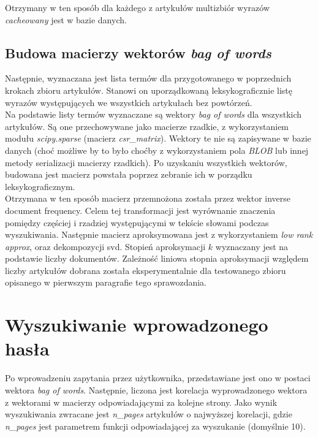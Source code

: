 \documentclass{article}
\begin{document}
        Otrzymany w ten sposób dla każdego z artykułów multizbiór wyrazów \textit{cacheowany} jest w bazie danych.
    
        \subsection{Budowa macierzy wektorów \textit{bag of words}}
        Następnie, wyznaczana jest lista termów dla przygotowanego w poprzednich krokach zbioru artykułów. Stanowi on uporządkowaną leksykograficznie listę wyrazów występujących we wszystkich artykułach bez powtórzeń.\\
        
        Na podstawie listy termów wyznaczane są wektory \textit{bag of words} dla wszystkich artykułów. Są one przechowywane jako macierze rzadkie, z wykorzystaniem modułu \textit{scipy.sparse} (macierz \textit{csr\_matrix}). Wektory te nie są zapisywane w bazie danych (choć możliwe by to było choćby z wykorzystaniem pola \textit{BLOB} lub innej metody serializacji macierzy rzadkich). Po uzyskaniu wszystkich wektorów, budowana jest macierz powstała poprzez zebranie ich w porządku leksykograficznym. \\
        
        Otrzymana w ten sposób macierz przemnożona została przez wektor inverse document frequency. Celem tej transformacji jest wyrównanie znaczenia pomiędzy częściej i rzadziej występującymi w tekście słowami podczas wyszukiwania. Następnie macierz aproksymowana jest z wykorzystaniem \textit{low rank approx}, oraz dekompozycji svd. Stopień aproksymacji $k$ wyznaczany jest na podstawie liczby dokumentów. Zależność liniowa stopnia aproksymacji względem liczby artykułów dobrana została eksperymentalnie dla testowanego zbioru opisanego w pierwszym paragrafie tego sprawozdania. 
        
    \section{Wyszukiwanie wprowadzonego hasła}
        Po wprowadzeniu zapytania przez użytkownika, przedstawiane jest ono w postaci wektora \textit{bag of words}. Następnie, liczona jest korelacja wyprowadzonego wektora z wektorami w macierzy odpowiadającymi za kolejne strony. Jako wynik wyszukiwania zwracane jest \textit{n\_pages} artykułów o najwyższej korelacji, gdzie \textit{n\_pages} jest parametrem funkcji odpowiadającej za wyszukanie (domyślnie 10).\\
        
\end{document}
